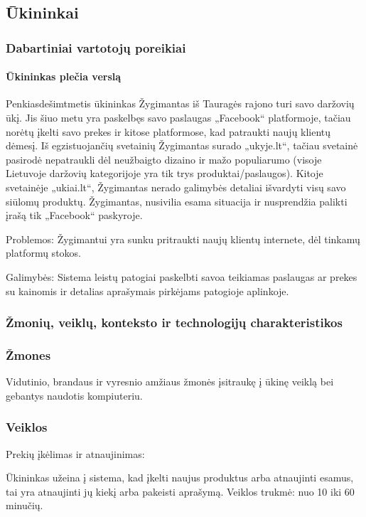 \documentclass{article}
\begin{document}
\subsection{Ūkininkai}
\subsubsection{Dabartiniai vartotojų poreikiai}
\paragraph{Ūkininkas plečia verslą}
		Penkiasdešimtmetis ūkininkas Žygimantas iš Tauragės rajono turi savo daržovių ūkį. Jis šiuo metu yra paskelbęs  savo paslaugas „Facebook“ platformoje, tačiau norėtų įkelti savo prekes ir kitose platformose, kad patraukti naujų klientų dėmesį. Iš egzistuojančių svetainių Žygimantas surado „ukyje.lt“, tačiau svetainė pasirodė nepatraukli dėl neužbaigto dizaino ir mažo populiarumo (visoje Lietuvoje daržovių kategorijoje yra tik trys produktai/paslaugos). Kitoje svetainėje „ukiai.lt“, Žygimantas nerado galimybės detaliai išvardyti visų savo siūlomų produktų. Žygimantas, nusivilia esama situacija ir nusprendžia palikti įrašą tik „Facebook“ paskyroje.\par
	Problemos: Žygimantui yra sunku pritraukti naujų klientų internete, dėl tinkamų platformų stokos.\par
	Galimybės: Sistema leistų patogiai paskelbti savoa teikiamas paslaugas ar prekes su kainomis ir detalias aprašymais pirkėjams patogioje aplinkoje.
\subsubsection{Žmonių, veiklų, konteksto ir technologijų charakteristikos}
\subsubsection*{Žmones}
	Vidutinio, brandaus ir vyresnio amžiaus žmonės įsitraukę į ūkinę veiklą bei gebantys naudotis kompiuteriu.
\subsubsection*{Veiklos}
	Prekių įkėlimas ir atnaujinimas:\par
	Ūkininkas užeina į sistema, kad įkelti naujus produktus arba atnaujinti esamus, tai yra atnaujinti jų kiekį arba pakeisti aprašymą. Veiklos trukmė: nuo 10 iki 60 minučių.
\end{document}
